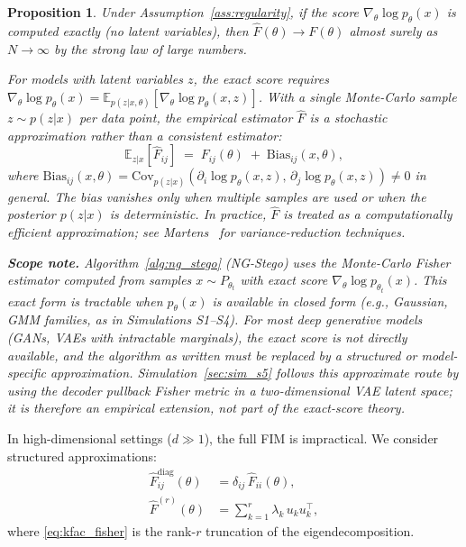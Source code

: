 \documentclass[a4paper,fleqn]{cas-dc}
\newtheorem{proposition}{Proposition}
\newcommand{\E}{\mathbb{E}}
\begin{document}
\begin{proposition}%
  \label{prop:empirical_fisher_consistency}
  Under Assumption~\ref{ass:regularity}, if the score
  $\nabla_\theta \log p_\theta(x)$ is computed \emph{exactly}
  (no latent variables), then $\widehat{F}(\theta)\to F(\theta)$
  almost surely as $N\to\infty$ by the strong law of large numbers.

  For models with latent variables $z$, the exact score requires
  $\nabla_\theta \log p_\theta(x) =
  \E_{p(z|x,\theta)}[\nabla_\theta \log p_\theta(x,z)]$.
  With a \emph{single} Monte-Carlo sample $z\sim p(z|x)$ per data point,
  the empirical estimator $\widehat{F}$ is a \emph{stochastic approximation}
  rather than a consistent estimator:
  \[
    \E_{z|x}[\widehat{F}_{ij}] \;=\;
    F_{ij}(\theta) \;+\; \mathrm{Bias}_{ij}(x,\theta),
  \]
  where $\mathrm{Bias}_{ij}(x,\theta) =
  \mathrm{Cov}_{p(z|x)}(\partial_i\log p_\theta(x,z),\,
  \partial_j\log p_\theta(x,z)) \neq 0$ in general.
  The bias vanishes only when multiple samples are used or when the
  posterior $p(z|x)$ is deterministic.  In practice, $\widehat{F}$ is
  treated as a computationally efficient approximation; see
  Martens~\cite{martens2015optimizing} for variance-reduction techniques.

  \textbf{Scope note.}
  Algorithm~\ref{alg:ng_stego} (NG-Stego) uses the Monte-Carlo Fisher estimator
  computed from samples $x \sim P_{\theta_t}$ with exact score
  $\nabla_\theta \log p_{\theta_t}(x)$.  This exact form is tractable when
  $p_\theta(x)$ is available in closed form (e.g., Gaussian, GMM
  families, as in Simulations S1--S4).
  For most deep generative models (GANs, VAEs with intractable
  marginals), the exact score is not directly available, and the
  algorithm as written must be replaced by a structured or model-specific
  approximation.  Simulation~\ref{sec:sim_s5} follows this approximate route
  by using the decoder pullback Fisher metric in a two-dimensional VAE latent
  space; it is therefore an empirical extension, not part of the exact-score
  theory.
\end{proposition}

In high-dimensional settings ($d\gg 1$), the full FIM is impractical.
We consider structured approximations:
\begin{align}
  \widehat{F}^{\mathrm{diag}}_{ij}(\theta)
  &= \delta_{ij}\,\widehat{F}_{ii}(\theta), \label{eq:diag_fisher} \\
  \widehat{F}^{(r)}(\theta)
  &= \sum_{k=1}^r \lambda_k\,u_k u_k^\top, \label{eq:kfac_fisher}
\end{align}
where \eqref{eq:kfac_fisher} is the rank-$r$ truncation of the eigendecomposition.
\end{document}
